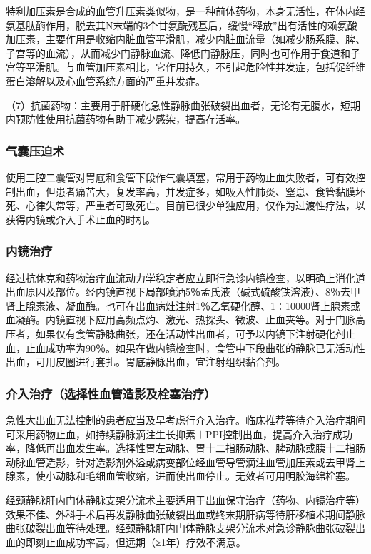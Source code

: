 特利加压素是合成的血管升压素类似物，是一种前体药物，本身无活性，在体内经氨基肽酶作用，脱去其N末端的3个甘氨酰残基后，缓慢“释放”出有活性的赖氨酸加压素，主要作用是收缩内脏血管平滑肌，减少内脏血流量（如减少肠系膜、脾、子宫等的血流），从而减少门静脉血流、降低门静脉压，同时也可作用于食道和子宫等平滑肌。与血管加压素相比，它作用持久，不引起危险性并发症，包括促纤维蛋白溶解以及心血管系统方面的严重并发症。

（7）抗菌药物：主要用于肝硬化急性静脉曲张破裂出血者，无论有无腹水，短期内预防性使用抗菌药物有助于减少感染，提高存活率。

\subsubsection{气囊压迫术}

使用三腔二囊管对胃底和食管下段作气囊填塞，常用于药物止血失败者，可有效控制出血，但患者痛苦大，复发率高，并发症多，如吸入性肺炎、窒息、食管黏膜坏死、心律失常等，严重者可致死亡。目前已很少单独应用，仅作为过渡性疗法，以获得内镜或介入手术止血的时机。

\subsubsection{内镜治疗}

经过抗休克和药物治疗血流动力学稳定者应立即行急诊内镜检查，以明确上消化道出血原因及部位。经内镜直视下局部喷洒5％孟氏液（碱式硫酸铁溶液）、8％去甲肾上腺素液、凝血酶。也可在出血病灶注射1％乙氧硬化醇、1∶10000肾上腺素或血凝酶。内镜直视下应用高频点灼、激光、热探头、微波、止血夹等。对于门脉高压者，如果仅有食管静脉曲张，还在活动性出血者，可予以内镜下注射硬化剂止血，止血成功率为90％。如果在做内镜检查时，食管中下段曲张的静脉已无活动性出血，可用皮圈进行套扎。胃底静脉出血，宜注射组织黏合剂。

\subsubsection{介入治疗（选择性血管造影及栓塞治疗）}

急性大出血无法控制的患者应当及早考虑行介入治疗。临床推荐等待介入治疗期间可采用药物止血，如持续静脉滴注生长抑素＋PPI控制出血，提高介入治疗成功率，降低再出血发生率。选择性胃左动脉、胃十二指肠动脉、脾动脉或胰十二指肠动脉血管造影，针对造影剂外溢或病变部位经血管导管滴注血管加压素或去甲肾上腺素，使小动脉和毛细血管收缩，进而使出血停止。无效者可用明胶海绵栓塞。

经颈静脉肝内门体静脉支架分流术主要适用于出血保守治疗（药物、内镜治疗等）效果不佳、外科手术后再发静脉曲张破裂出血或终末期肝病等待肝移植术期间静脉曲张破裂出血等待处理。经颈静脉肝内门体静脉支架分流术对急诊静脉曲张破裂出血的即刻止血成功率高，但远期（≥1年）疗效不满意。

